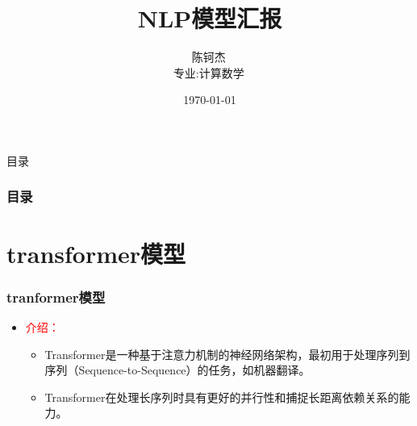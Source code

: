 \documentclass[t]{beamer}
\begin{document}
\begin{CJK*}{UTF8}{gkai}




	\title{NLP模型汇报}
	\subtitle {} %
	\author{
		陈钶杰\, \\
		专业:计算数学\,
	} %
	\date{\today}  %
\titlepage

\begin{frame}{目录}
\frametitle{目录}	
\tableofcontents  %
\end{frame} 

\newcommand{\eee}[1]{\begin{enumerate}#1\end{enumerate}}

\section{transformer模型}


\begin{frame}
	\frametitle{tranformer模型}
    \begin{itemize}
		\item
		\textcolor{red}{介绍：}
		\begin{itemize}
		\item Transformer是一种基于注意力机制的神经网络架构，最初用于处理序列到序列（Sequence-to-Sequence）的任务，如机器翻译。
		\item Transformer在处理长序列时具有更好的并行性和捕捉长距离依赖关系的能力。
		\end{itemize}
	\end{itemize}
\end{frame}


\end{CJK*}
\end{document}
